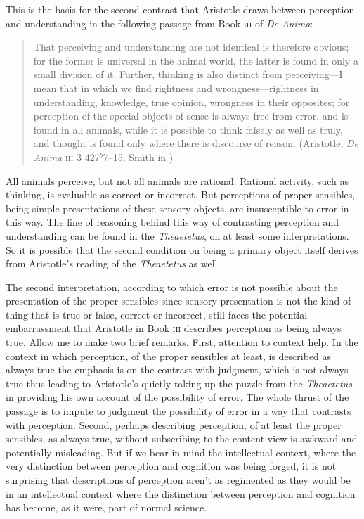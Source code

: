 \documentclass[12pt]{article}
\begin{document}
This is the basis for the second contrast that Aristotle draws between perception and understanding in the following passage from Book \textsc{iii} of \emph{De Anima}:
\begin{quote}
	That perceiving and understanding are not identical is therefore obvious; for the former is universal in the animal world, the latter is found in only a small division of it. Further, thinking is also distinct from perceiving---I mean that in which we find rightness and wrongness---right\-ness in understanding, knowledge, true opinion, wrongness in their opposites; for perception of the special objects of sense is always free from error, and is found in all animals, while it is possible to think falsely as well as truly, and thought is found only where there is discourse of reason. (Aristotle, \emph{De Anima} \textsc{iii} 3 427\( ^{b} \)7--15; Smith in \citealt[49]{Barnes:1984uq})
\end{quote}
All animals perceive, but not all animals are rational. Rational activity, such as thinking, is evaluable as correct or incorrect. But perceptions of proper sensibles, being simple presentations of these sensory objects, are insusceptible to error in this way. The line of reasoning behind this way of contrasting perception and understanding can be found in the \emph{Theaetetus}, on at least some interpretations. So it is possible that the second condition on being a primary object itself derives from Aristotle's reading of the \emph{Theaetetus} as well.

The second interpretation, according to which error is not possible about the presentation of the proper sensibles since sensory presentation is not the kind of thing that is true or false, correct or incorrect, still faces the potential embarrassment that Aristotle in Book \textsc{iii} describes perception as being always true. Allow me to make two brief remarks. First, attention to context help. In the context in which perception, of the proper sensibles at least, is described as always true the emphasis is on the contrast with judgment, which is not always true thus leading to Aristotle's quietly taking up the puzzle from the \emph{Theaetetus} in providing his own account of the possibility of error. The whole thrust of the passage is to impute to judgment the possibility of error in a way that contrasts with perception. Second, perhaps describing perception, of at least the proper sensibles, as always true, without subscribing to the content view is awkward and potentially misleading. But if we bear in mind the intellectual context, where the very distinction between perception and cognition was being forged, it is not surprising that descriptions of perception aren't as regimented as they would be in an intellectual context where the distinction between perception and cognition has become, as it were, part of normal science.
\end{document}
